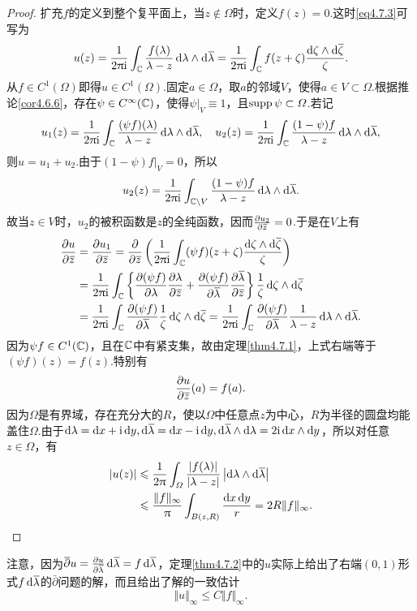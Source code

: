 \begin{proof}
	扩充$f$的定义到整个复平面上，当$z\notin\Omega$时，定义$f(z)=0$.这时\eqref{eq4.7.3}可写为
	\[u(z)=\frac1{2\uppi\mathrm i}\int_\mathbb C \frac{f(\lambda)}{\lambda-z}\mathop{}\!\mathrm{d}\lambda\wedge\mathop{}\!\mathrm{d}{}\mkern1mu\overline{\mkern-1mu\lambda}=\frac1{2\uppi\mathrm i}\int_\mathbb C f(z+\zeta)\frac{\mathop{}\!\mathrm{d}\zeta\wedge\mathop{}\!\mathrm{d}{}\mkern1mu\overline{\mkern-1mu\zeta}}{\zeta}.\]
	从$f\in C^1(\Omega)$即得$u\in C^1(\Omega)$.固定$a\in\Omega$，取$a$的邻域$V$，使得$a\in V\subset\Omega$.根据推论\ref{cor4.6.6}，存在$\psi\in C^\infty(\mathbb C)$，使得$\psi|_V\equiv1$，且$\operatorname{supp}\psi\subset\varOmega$.若记
	\[u_1(z)=\frac1{2\uppi\mathrm i}\int_\mathbb C \frac{(\psi f)(\lambda)}{\lambda-z}\mathop{}\!\mathrm{d}\lambda\wedge\mathop{}\!\mathrm{d}{}\mkern1mu\overline{\mkern-1mu\lambda},\quad u_2(z)=\frac1{2\uppi\mathrm i}\int_\mathbb C \frac{(1-\psi)f}{\lambda-z}\mathop{}\!\mathrm{d}\lambda\wedge\mathop{}\!\mathrm{d}{}\mkern1mu\overline{\mkern-1mu\lambda},\]
	则$u=u_1+u_2$.由于$(1-\psi)f|_V=0$，所以
	\[u_2(z)=\frac1{2\uppi\mathrm i}\int_{\mathbb C\setminus V}\frac{(1-\psi)f}{\lambda-z}\mathop{}\!\mathrm{d}\lambda\wedge\mathop{}\!\mathrm{d}{}\mkern1mu\overline{\mkern-1mu\lambda}.\]
	故当$z\in V$时，$u_2$的被积函数是$z$的全纯函数，因而$\frac{\partial u_2}{\partial {}\mkern1mu\overline{\mkern-1muz}}=0$.于是在$V$上有
	\begin{align*}
		\pp{u}{\bar{z}}
		&=\pp{u_1}{\bar{z}}=\pp{}{\bar{z}}\left(\frac{1}{2\pi\ii}\int_\MC (\psi f)(z+\zeta)\frac{\dif\zeta\wedge\dif\bar{\zeta}}{\zeta}\right)\\
		&=\frac1{2\pi\ii}\int_\MC \left\{\pp{(\psi f)}{\lambda}\pp{\lambda}{\bar{z}}+\pp{(\psi f)}{\bar{\lambda}}\pp{\bar{\lambda}}{\bar{z}}\right\}\frac1\zeta \dif\zeta\wedge\dif\bar{\zeta}\\
		&=\frac1{2\pi\ii}\int_\MC \pp{(\psi f)}{\bar{\lambda}}\frac1\zeta \dif\zeta\wedge\dif\bar{\zeta}=\frac1{2\pi\ii}\int_\MC \pp{(\psi f)}{\bar{\lambda}}\frac1{\lambda-z}\dif\lambda\wedge\dif\bar{\lambda}.
	\end{align*}
因为$\psi f\in C^1(\mathbb C)$，且在$\mathbb C$中有紧支集，故由定理\ref{thm4.7.1}，上式右端等于$(\psi f)(z)=f(z)$.特别有
\[\frac{\partial u}{\partial {}\mkern1mu\overline{\mkern-1muz}}(a)=f(a).\]
因为$\Omega$是有界域，存在充分大的$R$，使以$\Omega$中任意点$z$为中心，$R$为半径的圆盘均能盖住$\Omega$.由于$\dif\lambda=\dx+\ii\dy,\dif\bar{\lambda}=\dx-\ii\dy,\dif\bar{\lambda}\wedge\dif\lambda=2\ii\dx\wedge\dy$，所以对任意$z\in\Omega$，有
\begin{align*}
	|u(z)|
	&\leqslant\frac1{2\uppi}\int_\varOmega \frac{|f(\lambda)|}{|\lambda-z|}\left|\mathop{}\!\mathrm{d}\lambda\wedge\mathop{}\!\mathrm{d}{}\mkern1mu\overline{\mkern-1mu\lambda}\right|\\
	&\leqslant\frac{\Vert f\Vert_\infty}{\uppi}\int_{B(z,R)}\frac{\mathop{}\!\mathrm dx\mathop{}\!\mathrm dy}{r}=2R\Vert f\Vert_\infty.\qedhere
\end{align*}
\end{proof}
注意，因为${}\mkern1mu\overline{\mkern-1mu\partial}u=\frac{\partial u}{\partial {}\mkern1mu\overline{\mkern-1mu\lambda}}\mathop{}\!\mathrm{d}{}\mkern1mu\overline{\mkern-1mu\lambda}=f\mathop{}\!\mathrm{d}{}\mkern1mu\overline{\mkern-1mu\lambda}$，定理\ref{thm4.7.2}中的$u$实际上给出了右端$(0,1)$形式$f\mathop{}\!\mathrm{d}{}\mkern1mu\overline{\mkern-1mu\lambda}$的$\bar{\partial}$问题的解，而且给出了解的一致估计
\[\Vert u\Vert_\infty\le C\Vert f\Vert_\infty.\]
